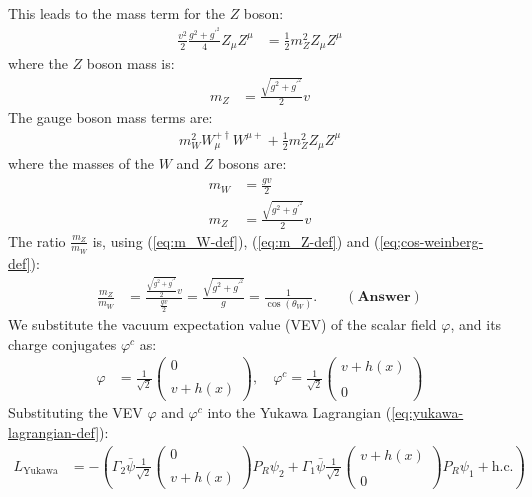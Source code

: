 This leads to the mass term for the $Z$ boson:
\begin{align}
    \frac{v^2}{2} \frac{g^2 + g^\prime ^2}{4} Z_\mu Z^\mu &= \frac{1}{2} m_Z^2 Z_\mu Z^\mu
\end{align}
where the $Z$ boson mass is:
\begin{align}
    m_Z &= \frac{\sqrt{g^2 + g^\prime ^2}}{2} v
\end{align}
The gauge boson mass terms are:
\begin{align}
    m_W^2 W^{+\dagger}_\mu W^{\mu+} + \frac{1}{2} m_Z^2 Z_\mu Z^\mu
\end{align}
where the masses of the $W$ and $Z$ bosons are:
\begin{align}
    m_W &= \frac{gv}{2} \label{eq:m_W-def}\\
    m_Z &= \frac{\sqrt{g^2 + g^\prime ^2}}{2} v\label{eq:m_Z-def}
\end{align}
The ratio $\displaystyle \frac{m_Z}{m_W}$ is, using (\ref{eq:m_W-def}), (\ref{eq:m_Z-def}) and (\ref{eq;cos-weinberg-def}):
\begin{align}
    \frac{m_Z}{m_W} &= \frac{\displaystyle\frac{\sqrt{g^2 + g^\prime ^2}}{2} v}{\displaystyle\frac{gv}{2}} = \frac{\sqrt{g^2 + g^\prime ^2}}{g} = \frac{1}{\cos(\theta_W)}.\qquad(\textbf{Answer})
\end{align}
We substitute the vacuum expectation value (VEV) of the scalar field $\varphi$, and its charge conjugates $\varphi^c$ as:
\begin{align}
    \varphi &= \frac{1}{\sqrt{2}} \begin{pmatrix} 0 \\\\ v + h(x) \end{pmatrix}, \quad \varphi^c = \frac{1}{\sqrt{2}} \begin{pmatrix} v + h(x) \\\\ 0 \end{pmatrix}
\end{align}
Substituting the VEV $\varphi$ and $\varphi^c$ into the Yukawa Lagrangian (\ref{eq:yukawa-lagrangian-def}):
\begin{align}
    L_{\text{Yukawa}} &= - \left( \Gamma_2 \bar{\psi} \frac{1}{\sqrt{2}} \begin{pmatrix} 0 \\\\ v + h(x) \end{pmatrix} P_R \psi_2 + \Gamma_1 \bar{\psi} \frac{1}{\sqrt{2}} \begin{pmatrix} v + h(x) \\\\ 0 \end{pmatrix} P_R \psi_1 + \text{h.c.} \right)
\end{align}
